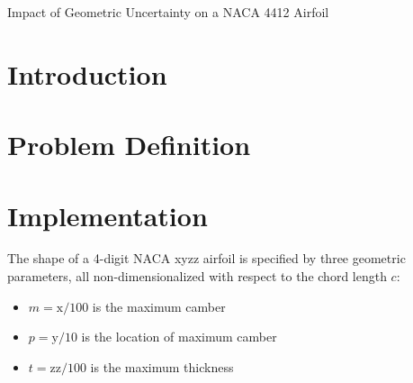 \documentclass[11pt]{article}
\begin{document}
{
	\fancyhf[LH]{\rightmark}
	\fancyhf[CH]{}
	\fancyhf[RH]{\thepage\hspace*{1ex}/\hspace*{1ex}\pageref{lastpage}}
	\fancyhf[LF]{}
	\fancyhf[CF]{}
	\fancyhf[RF]{}
}

{
	\fancyhf[CH]{}
	\fancyhf[LF]{}
	\fancyhf[CF]{}
	\fancyhf[RF]{}
}

\pagestyle{allpages}
\thispagestyle{firstpage}
\renewcommand{\sectionmark}[1]{ \markright{#1}{} }

\vspace*{0in}
\begin{center}
\LARGE Impact of Geometric Uncertainty on a NACA 4412 Airfoil
\end{center}
\vspace*{0.3in}

\section{Introduction}

\section{Problem Definition}

\section{Implementation}

The shape of a 4-digit NACA xyzz airfoil is specified by three geometric parameters, all non-dimensionalized with respect to the chord length $c$:
\begin{itemize}
\item $m = \text{x} / 100$ is the maximum camber
\item $p = \text{y} / 10$ is the location of maximum camber
\item $t = \text{zz}/100$ is the maximum thickness
\end{itemize}
\end{document}
